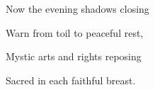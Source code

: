 \begin{flushleft}
\small
Now the evening shadows closing\par
Warn from toil to peaceful rest,\par
Mystic arts and rights reposing\par
Sacred in each faithful breast.
\end{flushleft}
